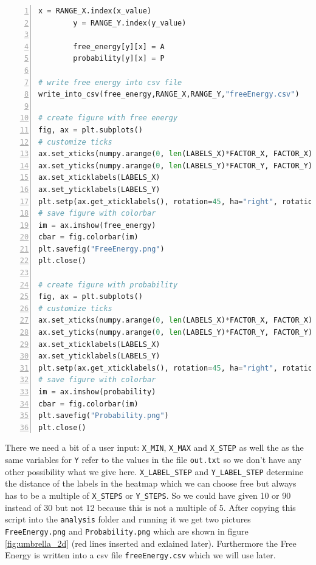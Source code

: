 \documentclass[a4paper,11pt]{scrartcl}
\begin{document}
\begin{lstlisting}[frame=single,language=python,basicstyle=\footnotesize,commentstyle=\color{red},keywordstyle=\color{blue},stringstyle=\color{mygreen},numbers=left]
        x = RANGE_X.index(x_value)
        y = RANGE_Y.index(y_value)

        free_energy[y][x] = A
        probability[y][x] = P

# write free energy into csv file
write_into_csv(free_energy,RANGE_X,RANGE_Y,"freeEnergy.csv")

# create figure with free energy
fig, ax = plt.subplots()
# customize ticks
ax.set_xticks(numpy.arange(0, len(LABELS_X)*FACTOR_X, FACTOR_X))
ax.set_yticks(numpy.arange(0, len(LABELS_Y)*FACTOR_Y, FACTOR_Y))
ax.set_xticklabels(LABELS_X)
ax.set_yticklabels(LABELS_Y)
plt.setp(ax.get_xticklabels(), rotation=45, ha="right", rotation_mode="anchor")
# save figure with colorbar
im = ax.imshow(free_energy)
cbar = fig.colorbar(im)
plt.savefig("FreeEnergy.png")
plt.close()

# create figure with probability
fig, ax = plt.subplots()
# customize ticks
ax.set_xticks(numpy.arange(0, len(LABELS_X)*FACTOR_X, FACTOR_X))
ax.set_yticks(numpy.arange(0, len(LABELS_Y)*FACTOR_Y, FACTOR_Y))
ax.set_xticklabels(LABELS_X)
ax.set_yticklabels(LABELS_Y)
plt.setp(ax.get_xticklabels(), rotation=45, ha="right", rotation_mode="anchor")
# save figure with colorbar
im = ax.imshow(probability)
cbar = fig.colorbar(im)
plt.savefig("Probability.png")
plt.close()

\end{lstlisting}

There we need a bit of a user input: \texttt{X\_MIN}, \texttt{X\_MAX} and \texttt{X\_STEP} as well the as the same variables for \texttt{Y} refer to the values in the file \texttt{out.txt} so we don't have any other possibility what we give here. \texttt{X\_LABEL\_STEP} and \texttt{Y\_LABEL\_STEP} determine the distance of the labels in the heatmap which we can choose free but always has to be a multiple of \texttt{X\_STEPS} or \texttt{Y\_STEPS}. So we could have given 10 or 90 instead of 30 but not 12 because this is not a multiple of 5. After copying this script into the \texttt{analysis} folder and running it we get two pictures \texttt{FreeEnergy.png} and \texttt{Probability.png} which are shown in figure \ref{fig:umbrella_2d} (red lines inserted and exlained later). Furthermore the Free Energy is written into a csv file \texttt{freeEnergy.csv} which we will use later.
\end{document}
